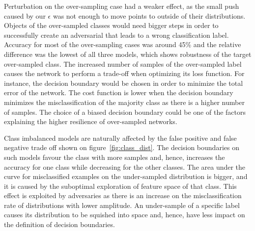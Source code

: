 \documentclass[runningheads,a4paper]{llncs}
\begin{document}
Perturbation on the over-sampling case had a weaker effect, as the small push caused by our $\epsilon$ was not enough to move points to outside of their distributions. Objects of the over-sampled classes would need bigger steps in order to successfully create an adversarial that leads to a wrong classification label. Accuracy for most of the over-sampling cases was around 45\% and the relative difference was the lowest of all three models, which shows robustness of the target over-sampled class. The increased number of samples of the over-sampled label causes the network to perform a trade-off when optimizing its loss function. For instance, the decision boundary would be chosen in order to minimize the total error of the network. The cost function is lower when the decision boundary minimizes the misclassification of the majority class as there is a higher number of samples. The choice of a biased decision boundary could be one of the factors explaining the higher resilience of over-sampled networks.

Class imbalanced models are naturally affected by the false positive and false negative trade off shown on figure~\ref{fig:class_dist}. The decision boundaries on such models favour the class with more samples and, hence, increases the accuracy for one class while decreasing for the other classes. The area under the curve for misclassified examples on the under-sampled distribution is bigger, and it is caused by the suboptimal exploration of feature space of that class. This effect is exploited by adversaries as there is an increase on the misclassification rate of distributions with lower amplitude. An under-sample of a specific label causes its distribution to be squished into space and, hence, have less impact on the definition of decision boundaries.
\end{document}
